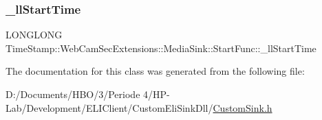 \subsubsection{\texorpdfstring{\+\_\+ll\+Start\+Time}{\_llStartTime}}
{\footnotesize\ttfamily L\+O\+N\+G\+L\+O\+NG Time\+Stamp\+::\+Web\+Cam\+Sec\+Extensions\+::\+Media\+Sink\+::\+Start\+Func\+::\+\_\+ll\+Start\+Time}



The documentation for this class was generated from the following file\+:\begin{DoxyCompactItemize}
\item 
D\+:/\+Documents/\+H\+B\+O/3/\+Periode 4/\+H\+P-\/\+Lab/\+Development/\+E\+L\+I\+Client/\+Custom\+Eli\+Sink\+Dll/\hyperlink{_custom_sink_8h}{Custom\+Sink.\+h}\end{DoxyCompactItemize}
